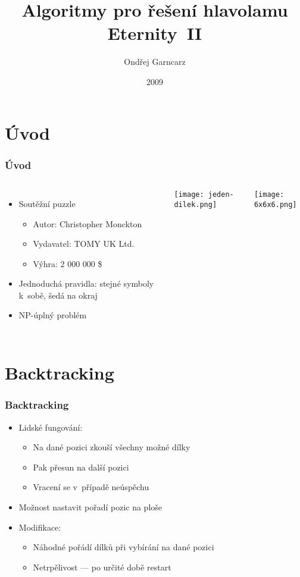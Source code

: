 \documentclass{beamer}
\title[Eternity~II]{Algoritmy pro řešení hlavolamu Eternity~II}
\author{Ondřej Garncarz}
\institute[VŠB-TUO]{Vysoká škola Báňská --- Technická univerzita Ostrava}
\date{2009}
\begin{document}
\frame{\titlepage}


\section{Úvod}

\begin{frame}
\frametitle{Úvod}

\begin{columns}

\begin{itemize}
\item Soutěžní puzzle
\begin{itemize}
\item Autor: Christopher Monckton
\item Vydavatel: TOMY UK Ltd.
\item Výhra: 2 000 000 \$
\end{itemize}
\item Jednoduchá pravidla: stejné symboly k~sobě, šedá na okraj
\item NP-úplný problém
\end{itemize}

\centering
\texttt{[image: jeden-dilek.png]}

\texttt{[image: 6x6x6.png]}

\end{columns}

\end{frame}


\section{Backtracking}

\begin{frame}
\frametitle{Backtracking}

\begin{itemize}

\item Lidské fungování:
\begin{itemize}
\item Na dané pozici zkouší všechny možné dílky
\item Pak přesun na další pozici
\item Vracení se v~případě neúspěchu
\end{itemize}

\item Možnost nastavit pořadí pozic na ploše

\item Modifikace:
\begin{itemize}
\item Náhodné pořádí dílků při vybírání na dané pozici
\item Netrpělivost --- po určité době restart
\end{itemize}

\end{itemize}

\end{frame}
\end{document}
